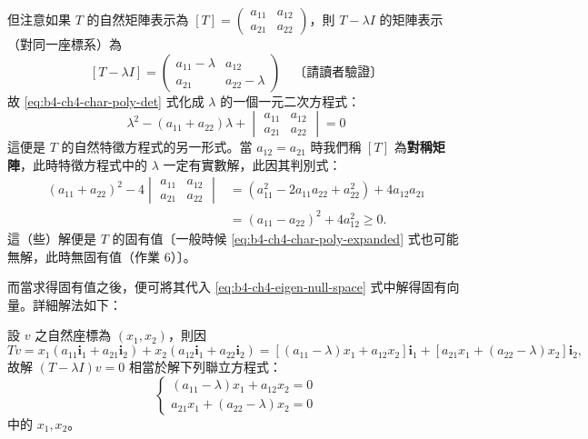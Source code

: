 但注意如果 $T$ 的自然矩陣表示為 $[T] = \begin{pmatrix} a_{11} & a_{12} \\ a_{21} & a_{22} \end{pmatrix}$，則 $T - \lambda I$ 的矩陣表示（對同一座標系）為
\[
[T - \lambda I] = \begin{pmatrix} a_{11} - \lambda & a_{12} \\ a_{21} & a_{22} - \lambda \end{pmatrix} \quad \text{〔請讀者驗證〕}
\]
故 \eqref{eq:b4-ch4-char-poly-det} 式化成 $\lambda$ 的一個一元二次方程式：
\begin{equation}
\lambda^2 - (a_{11} + a_{22})\lambda + \begin{vmatrix} a_{11} & a_{12} \\ a_{21} & a_{22} \end{vmatrix} = 0
\label{eq:b4-ch4-char-poly-expanded}
\end{equation}
這便是 $T$ 的自然特徵方程式的另一形式。當 $a_{12} = a_{21}$ 時我們稱 $[T]$ 為\textbf{對稱矩陣}，此時特徵方程式中的 $\lambda$ 一定有實數解，此因其判別式：
\[
\begin{aligned}
(a_{11} + a_{22})^2 - 4\begin{vmatrix} a_{11} & a_{12} \\ a_{21} & a_{22} \end{vmatrix}
&= (a_{11}^2 - 2a_{11} a_{22} + a_{22}^2) + 4a_{12} a_{21} \\
&= (a_{11} - a_{22})^2 + 4a_{12}^2 \ge 0.
\end{aligned}
\]
這（些）解便是 $T$ 的固有值〔一般時候 \eqref{eq:b4-ch4-char-poly-expanded} 式也可能無解，此時無固有值（作業 6）〕。

而當求得固有值之後，便可將其代入 \eqref{eq:b4-ch4-eigen-null-space} 式中解得固有向量。詳細解法如下：

設 $v$ 之自然座標為 $(x_1, x_2)$，則因
\[
Tv = x_1 (a_{11} \mathbf{i}_1 + a_{21} \mathbf{i}_2) + x_2 (a_{12} \mathbf{i}_1 + a_{22} \mathbf{i}_2) = [(a_{11} - \lambda)x_1 + a_{12} x_2]\mathbf{i}_1 + [a_{21} x_1 + (a_{22} - \lambda)x_2]\mathbf{i}_2,
\]
故解 $(T - \lambda I)v = 0$ 相當於解下列聯立方程式：
\begin{equation}
\begin{cases}
(a_{11} - \lambda)x_1 + a_{12} x_2 = 0 \\
a_{21} x_1 + (a_{22} - \lambda)x_2 = 0
\end{cases}
\label{eq:b4-ch4-eigen-system}
\end{equation}
中的 $x_1, x_2$。


